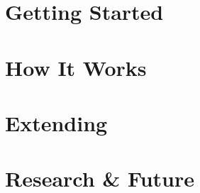 \documentclass[11pt, letterpaper, openany]{book}
\begin{document}
\part{Getting Started}




\part{How It Works}








\part{Extending \sysname{}}




\part{Research \& Future}




\appendix





\backmatter


\end{document}
